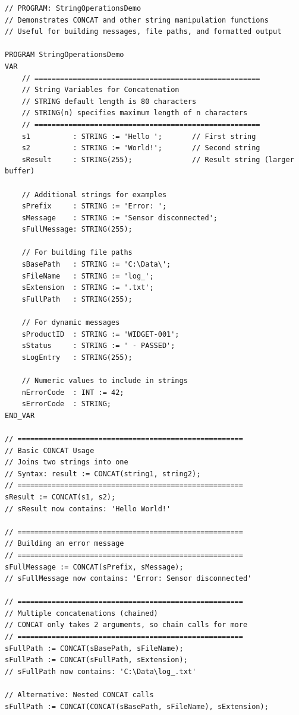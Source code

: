 \documentclass[11pt,a4paper]{article}
\begin{document}
\begin{lstlisting}
// PROGRAM: StringOperationsDemo
// Demonstrates CONCAT and other string manipulation functions
// Useful for building messages, file paths, and formatted output

PROGRAM StringOperationsDemo
VAR
    // =====================================================
    // String Variables for Concatenation
    // STRING default length is 80 characters
    // STRING(n) specifies maximum length of n characters
    // =====================================================
    s1          : STRING := 'Hello ';       // First string
    s2          : STRING := 'World!';       // Second string
    sResult     : STRING(255);              // Result string (larger buffer)
    
    // Additional strings for examples
    sPrefix     : STRING := 'Error: ';
    sMessage    : STRING := 'Sensor disconnected';
    sFullMessage: STRING(255);
    
    // For building file paths
    sBasePath   : STRING := 'C:\Data\';
    sFileName   : STRING := 'log_';
    sExtension  : STRING := '.txt';
    sFullPath   : STRING(255);
    
    // For dynamic messages
    sProductID  : STRING := 'WIDGET-001';
    sStatus     : STRING := ' - PASSED';
    sLogEntry   : STRING(255);
    
    // Numeric values to include in strings
    nErrorCode  : INT := 42;
    sErrorCode  : STRING;
END_VAR

// =====================================================
// Basic CONCAT Usage
// Joins two strings into one
// Syntax: result := CONCAT(string1, string2);
// =====================================================
sResult := CONCAT(s1, s2);
// sResult now contains: 'Hello World!'

// =====================================================
// Building an error message
// =====================================================
sFullMessage := CONCAT(sPrefix, sMessage);
// sFullMessage now contains: 'Error: Sensor disconnected'

// =====================================================
// Multiple concatenations (chained)
// CONCAT only takes 2 arguments, so chain calls for more
// =====================================================
sFullPath := CONCAT(sBasePath, sFileName);
sFullPath := CONCAT(sFullPath, sExtension);
// sFullPath now contains: 'C:\Data\log_.txt'

// Alternative: Nested CONCAT calls
sFullPath := CONCAT(CONCAT(sBasePath, sFileName), sExtension);


\end{lstlisting}
\end{document}
